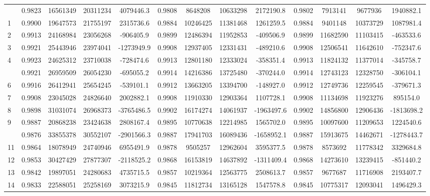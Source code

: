 \documentclass[
  12pt,
]{article}
\begin{document}
\begin{longtable}[t]{lcccccccccccc}
\endfoot
\bottomrule
\endlastfoot
0 & 0.9823 & 16561349 & 20311234 & 4079446.3 & 0.9808 & 8648208 & 10633298 & 2172190.8 & 0.9802 & 7913141 & 9677936 & 1940882.1\\
1 & 0.9900 & 19647573 & 21755197 & 2315736.6 & 0.9884 & 10246425 & 11381468 & 1261259.5 & 0.9884 & 9401148 & 10373729 & 1087981.4\\
2 & 0.9913 & 24168984 & 23056268 & -906405.9 & 0.9899 & 12486394 & 11952853 & -409506.9 & 0.9899 & 11682590 & 11103415 & -463533.6\\
3 & 0.9921 & 25443946 & 23974041 & -1273949.9 & 0.9908 & 12937405 & 12331431 & -489210.6 & 0.9908 & 12506541 & 11642610 & -752347.6\\
4 & 0.9923 & 24625312 & 23710038 & -728474.6 & 0.9913 & 12801180 & 12333024 & -358351.4 & 0.9913 & 11824132 & 11377014 & -345758.7\\
\addlinespace
5 & 0.9921 & 26959509 & 26054230 & -695055.2 & 0.9914 & 14216386 & 13725480 & -370244.0 & 0.9914 & 12743123 & 12328750 & -306104.1\\
6 & 0.9916 & 26412941 & 25654245 & -539101.1 & 0.9912 & 13663205 & 13394700 & -148927.0 & 0.9912 & 12749736 & 12259545 & -379671.3\\
7 & 0.9908 & 23045028 & 24826640 & 2002882.1 & 0.9908 & 11910330 & 12903364 & 1107728.1 & 0.9908 & 11134698 & 11923276 & 895154.0\\
8 & 0.9898 & 31031074 & 26968373 & -3765486.5 & 0.9902 & 16174274 & 14061937 & -1963497.6 & 0.9902 & 14856800 & 12906436 & -1813698.2\\
9 & 0.9887 & 20868238 & 23424638 & 2808167.4 & 0.9895 & 10770638 & 12214985 & 1565702.0 & 0.9895 & 10097600 & 11209653 & 1224540.6\\
\addlinespace
10 & 0.9876 & 33855378 & 30552107 & -2901566.3 & 0.9887 & 17941703 & 16089436 & -1658952.1 & 0.9887 & 15913675 & 14462671 & -1278443.7\\
11 & 0.9864 & 18078949 & 24740946 & 6955491.9 & 0.9878 & 9505257 & 12962604 & 3595377.5 & 0.9878 & 8573692 & 11778342 & 3329684.8\\
12 & 0.9853 & 30427429 & 27877307 & -2118525.2 & 0.9868 & 16153819 & 14637892 & -1311409.4 & 0.9868 & 14273610 & 13239415 & -851440.2\\
13 & 0.9842 & 19897051 & 24280683 & 4735715.5 & 0.9857 & 10219364 & 12563775 & 2508613.7 & 0.9857 & 9677687 & 11716908 & 2193407.7\\
14 & 0.9833 & 22588051 & 25258169 & 3073215.9 & 0.9845 & 11812734 & 13165128 & 1547578.8 & 0.9845 & 10775317 & 12093041 & 1496429.3\\

\end{longtable}
\end{document}
